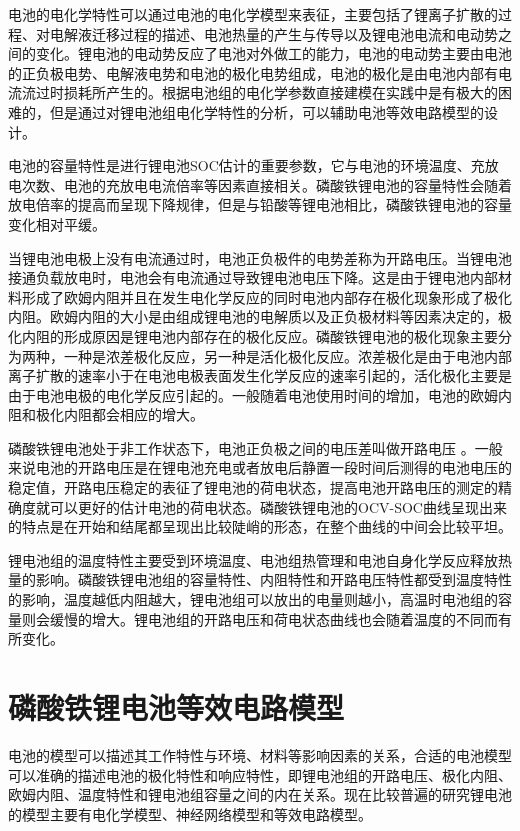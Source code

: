 	电池的电化学特性可以通过电池的电化学模型来表征，主要包括了锂离子扩散的过程、对电解液迁移过程的描述、电池热量的产生与传导以及锂电池电流和电动势之间的变化。锂电池的电动势反应了电池对外做工的能力，电池的电动势主要由电池的正负极电势、电解液电势和电池的极化电势组成，电池的极化是由电池内部有电流流过时损耗所产生的。根据电池组的电化学参数直接建模在实践中是有极大的困难的，但是通过对锂电池组电化学特性的分析，可以辅助电池等效电路模型的设计。
\begin{enumerate}

	电池的容量特性是进行锂电池SOC估计的重要参数，它与电池的环境温度、充放电次数、电池的充放电电流倍率等因素直接相关。磷酸铁锂电池的容量特性会随着放电倍率的提高而呈现下降规律，但是与铅酸等锂电池相比，磷酸铁锂电池的容量变化相对平缓。

	当锂电池电极上没有电流通过时，电池正负极件的电势差称为开路电压。当锂电池接通负载放电时，电池会有电流通过导致锂电池电压下降。这是由于锂电池内部材料形成了欧姆内阻并且在发生电化学反应的同时电池内部存在极化现象形成了极化内阻。欧姆内阻的大小是由组成锂电池的电解质以及正负极材料等因素决定的，极化内阻的形成原因是锂电池内部存在的极化反应。磷酸铁锂电池的极化现象主要分为两种，一种是浓差极化反应，另一种是活化极化反应。浓差极化是由于电池内部 离子扩散的速率小于在电池电极表面发生化学反应的速率引起的，活化极化主要是由于电池电极的电化学反应引起的。一般随着电池使用时间的增加，电池的欧姆内阻和极化内阻都会相应的增大。

	磷酸铁锂电池处于非工作状态下，电池正负极之间的电压差叫做开路电压 。一般来说电池的开路电压是在锂电池充电或者放电后静置一段时间后测得的电池电压的稳定值，开路电压稳定的表征了锂电池的荷电状态，提高电池开路电压的测定的精确度就可以更好的估计电池的荷电状态。磷酸铁锂电池的OCV-SOC曲线呈现出来的特点是在开始和结尾都呈现出比较陡峭的形态，在整个曲线的中间会比较平坦。

	锂电池组的温度特性主要受到环境温度、电池组热管理和电池自身化学反应释放热量的影响。磷酸铁锂电池组的容量特性、内阻特性和开路电压特性都受到温度特性的影响，温度越低内阻越大，锂电池组可以放出的电量则越小，高温时电池组的容量则会缓慢的增大。锂电池组的开路电压和荷电状态曲线也会随着温度的不同而有所变化。
\end{enumerate}
\section{磷酸铁锂电池等效电路模型}
电池的模型可以描述其工作特性与环境、材料等影响因素的关系，合适的电池模型可以准确的描述电池的极化特性和响应特性，即锂电池组的开路电压、极化内阻、欧姆内阻、温度特性和锂电池组容量之间的内在关系。现在比较普遍的研究锂电池的模型主要有电化学模型、神经网络模型和等效电路模型。

